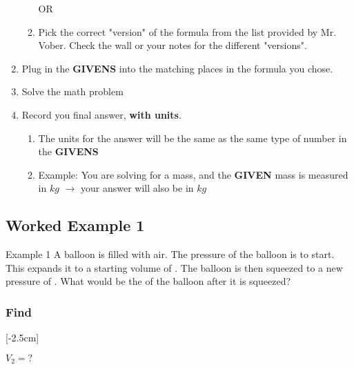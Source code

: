 \documentclass[../../main.tex]{subfiles}
\begin{document}
\begin{enumerate}
\begin{enumerate}
		            OR

		      \item Pick the correct "version" of the formula from the list provided by Mr. Vober.  Check the wall or your notes for the different "versions".
	      \end{enumerate}
	\item Plug in the \textbf{GIVENS} into the matching places in the formula you chose.
	\item Solve the math problem
	\item Record you final answer, \textbf{with units}.
	\begin{enumerate}
		\item The units for the answer will be the same as the same type of number in the \textbf{GIVENS}
		\item Example: You are solving for a mass, and the \textbf{GIVEN} mass is measured in $kg$ $\rightarrow$ your answer will also be in $kg$
	\end{enumerate}
\end{enumerate}

\newpage
\subsection{Worked Example 1}

\begin{boxGray}{Example 1}
	A balloon is filled with air.  The pressure of the balloon is  to start.  This expands it to a starting volume of .  The balloon is then squeezed to a new pressure of .  What would be the  of the balloon after it is squeezed?
\end{boxGray}

\subsubsection{Find}

[-2.5cm]

$V_2 = ?$

\end{document}
